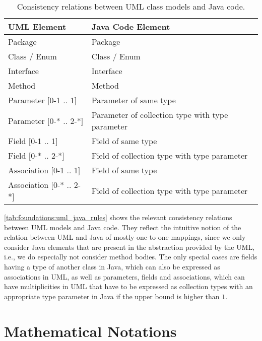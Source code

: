 \begin{table}
	\centering 
    \small
    \renewcommand{\arraystretch}{1.4}
	\begin{tabular}{p{3cm} p{6.8cm}}
		\toprule
        \textbf{\gls{UML} Element}  & \textbf{Java Code Element} \\
        \midrule
        Package                         & Package\\
		Class / Enum                    & Class / Enum \\
		Interface		   	            & Interface \\
        Method                          & Method \\
        Parameter $[$0-1 .. 1$]$        & Parameter of same type \\
        Parameter $[$0-* .. 2-*$]$      & Parameter of collection type with type parameter \\
        Field $[$0-1 .. 1$]$            & Field of same type\\
        Field $[$0-* .. 2-*$]$          & Field of collection type with type parameter\\
        Association $[$0-1 .. 1$]$      & Field of same type\\
        Association $[$0-* .. 2-*$]$    & Field of collection type with type parameter\\
		\bottomrule
	\end{tabular}
	\caption[Consistency relation between \acrshort{UML} and Java]{Consistency relations between \gls{UML} class models and Java code.}
	\label{tab:foundations:uml_java_rules}
\end{table}

\autoref{tab:foundations:uml_java_rules} shows the relevant consistency relations between \gls{UML} models and Java code.
They reflect the intuitive notion of the relation between \gls{UML} and Java of mostly one-to-one mappings, since we only consider Java elements that are present in the abstraction provided by the \gls{UML}, i.e., we do especially not consider method bodies.
The only special cases are fields having a type of another class in Java, which can also be expressed as associations in \gls{UML}, as well as parameters, fields and associations, which can have multiplicities in \gls{UML} that have to be expressed as collection types with an appropriate type parameter in Java if the upper bound is higher than $1$.


\section{Mathematical Notations}
\label{chap:foundations:notations}

